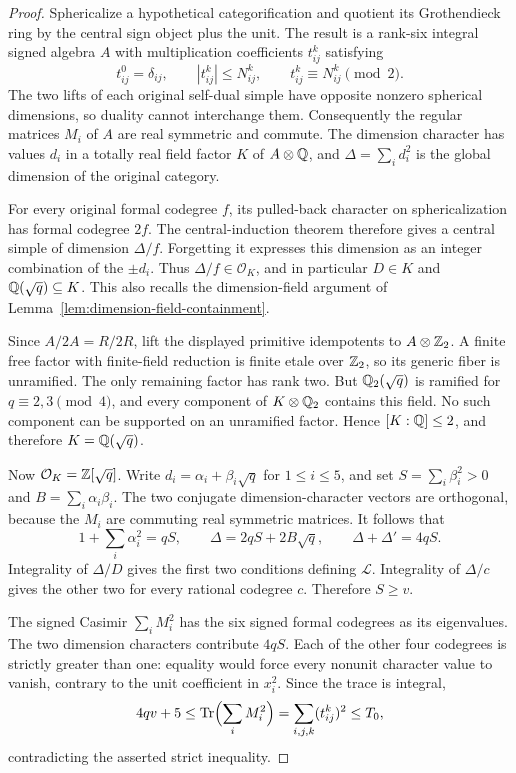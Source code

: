 \begin{proof}
Sphericalize a hypothetical categorification and quotient its Grothendieck
ring by the central sign object plus the unit.  The result is a rank-six
integral signed algebra $A$ with multiplication coefficients $t_{ij}^k$
satisfying
\[
 t_{ij}^0=\delta_{ij},\qquad
 |t_{ij}^k|\le N_{ij}^k,\qquad
 t_{ij}^k\equiv N_{ij}^k\pmod2.
\]
The two lifts of each original self-dual simple have opposite nonzero
spherical dimensions, so duality cannot interchange them.  Consequently
the regular matrices $M_i$ of $A$ are real symmetric and commute.
The dimension character has values $d_i$ in a totally real field factor
$K$ of $A\otimes\mathbb Q$, and $\Delta=\sum_i d_i^2$ is the global dimension
of the original category.

For every original formal codegree $f$, its pulled-back character on
sphericalization has formal codegree $2f$.
The central-induction theorem
\cite[Theorem~2.13]{Ostrik3} therefore gives a central simple of dimension
$\Delta/f$.  Forgetting it expresses this dimension as an integer
combination of the $\pm d_i$.  Thus $\Delta/f\in\mathcal O_K$, and in
particular $D\in K$ and $\mathbb Q(\sqrt q)\subseteq K$.
This also recalls the dimension-field argument of
Lemma~\ref{lem:dimension-field-containment}.

Since $A/2A=R/2R$, lift the displayed primitive idempotents to
$A\otimes\mathbb Z_2$.  A finite free factor with finite-field reduction is
finite etale over $\mathbb Z_2$, so its generic fiber is unramified.  The only
remaining factor has rank two.  But $\mathbb Q_2(\sqrt q)$ is ramified for
$q\equiv2,3\pmod4$, and every component of $K\otimes\mathbb Q_2$ contains
this field.  No such component can be supported on an unramified factor.
Hence $[K:\mathbb Q]\le2$, and therefore $K=\mathbb Q(\sqrt q)$.

Now $\mathcal O_K=\mathbb Z[\sqrt q]$.  Write
$d_i=\alpha_i+\beta_i\sqrt q$ for $1\le i\le5$, and set
$S=\sum_i\beta_i^2>0$ and $B=\sum_i\alpha_i\beta_i$.
The two conjugate dimension-character vectors are orthogonal, because
the $M_i$ are commuting real symmetric matrices.  It follows that
\[
 1+\sum_i\alpha_i^2=qS,\qquad
 \Delta=2qS+2B\sqrt q,\qquad
 \Delta+\Delta'=4qS.
\]
Integrality of $\Delta/D$ gives the first two conditions defining
$\mathcal L$.  Integrality of $\Delta/c$ gives the other two for every
rational codegree $c$.  Therefore $S\ge v$.

The signed Casimir $\sum_iM_i^2$ has the six signed formal codegrees as
its eigenvalues.  The two dimension characters contribute $4qS$.
Each of the other four codegrees is strictly greater than one: equality
would force every nonunit character value to vanish, contrary to the
unit coefficient in $x_i^2$.  Since the trace is integral,
\[
 4qv+5\le\operatorname{Tr}\Bigl(\sum_iM_i^2\Bigr)
 =\sum_{i,j,k}(t_{ij}^k)^2\le T_0,
\]
contradicting the asserted strict inequality.
\end{proof}

